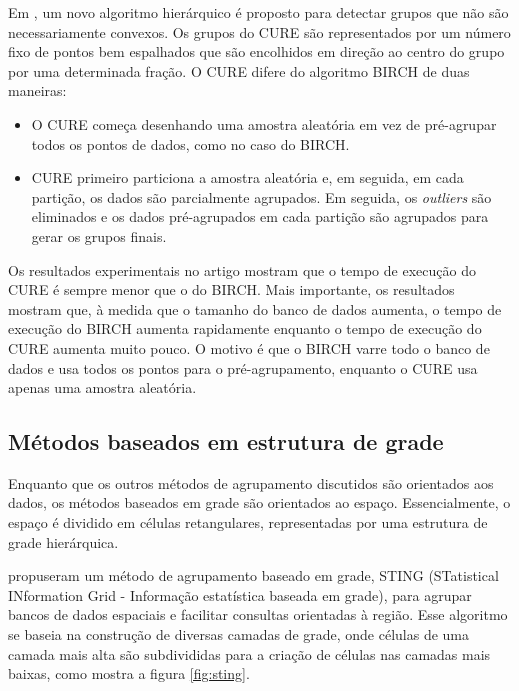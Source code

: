 Em \cite{Guha1998}, um novo algoritmo hierárquico é proposto para detectar grupos que não são necessariamente convexos. Os grupos do CURE são representados por um número fixo de pontos bem espalhados que são encolhidos em direção ao centro do grupo por uma determinada fração. O CURE difere do algoritmo BIRCH de duas maneiras:
\begin{itemize}
\item O CURE começa desenhando uma amostra aleatória em vez de pré-agrupar todos os pontos de dados, como no caso do BIRCH.
\item CURE primeiro particiona a amostra aleatória e, em seguida, em cada partição, os dados são parcialmente agrupados. Em seguida, os \textit{outliers} são eliminados e os dados pré-agrupados em cada partição são agrupados para gerar os grupos finais.
\end{itemize}
Os resultados experimentais no artigo mostram que o tempo de execução do CURE é sempre menor que o do BIRCH. Mais importante, os resultados mostram que, à medida que o tamanho do banco de dados aumenta, o tempo de execução do BIRCH aumenta rapidamente enquanto o tempo de execução do CURE aumenta muito pouco. O motivo é que o BIRCH varre todo o banco de dados e usa todos os pontos para o pré-agrupamento, enquanto o CURE usa apenas uma amostra aleatória.

\subsection{Métodos baseados em estrutura de grade}
Enquanto que os outros métodos de agrupamento discutidos são orientados aos dados, os métodos baseados em grade são orientados ao espaço. Essencialmente, o espaço é dividido em células retangulares, representadas por uma estrutura de grade hierárquica.

\cite{Wang1997} propuseram um método de agrupamento baseado em grade, STING (STatistical INformation Grid - Informação estatística baseada em grade), para agrupar bancos de dados espaciais e facilitar consultas orientadas à região. Esse algoritmo se baseia na construção de diversas camadas de grade, onde células de uma camada mais alta são subdivididas para a criação de células nas camadas mais baixas, como mostra a figura \ref{fig:sting}.

\begin{figure}[!h]
	\centering	
\end{figure}

